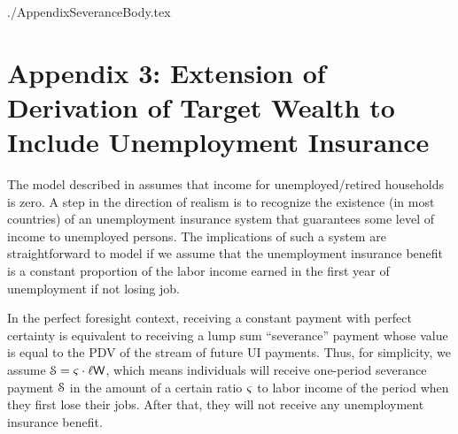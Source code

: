 \documentclass{\econtex}
\begin{document}


\begin{verbatimwrite}{./AppendixSeveranceBody.tex}


\section*{Appendix 3: Extension of Derivation of Target Wealth to Include Unemployment Insurance}

The model described in \cite{ctDiscrete} assumes that income for
unemployed/retired households is zero.  A step in the direction of
realism is to recognize the existence (in most countries) of an unemployment
insurance system that guarantees some level of income to unemployed
persons.  The implications of such a system are straightforward to
model if we assume that the unemployment insurance benefit is a
constant proportion of the labor income earned in the first year of unemployment if not losing job.

In the perfect foresight context, receiving a constant payment with
perfect certainty is equivalent to receiving a lump sum ``severance''
payment whose value is equal to the PDV of the stream of future UI
payments.  Thus, for simplicity, we assume
$\mathcal{S}=\varsigma\cdot\ell\mathsf{W}$, which means
individuals will receive one-period severance payment $\mathcal{S}$ in the amount of
a certain ratio $\varsigma$ to labor income of the period when they first lose their jobs. After that, they will not receive any unemployment
insurance benefit.


\end{verbatimwrite}
\end{document}
